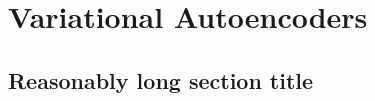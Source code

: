 
\chapter{Variational Autoencoders}
\label{chapter2}

\ifpdf
    \graphicspath{{Chapter2/Figs/Raster/}{Chapter2/Figs/PDF/}{Chapter2/Figs/}}
\else
    \graphicspath{{Chapter2/Figs/Vector/}{Chapter2/Figs/}}
\fi


\section[Short title]{Reasonably long section title}
\label{section2.1}